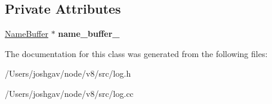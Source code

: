 \subsection*{Private Attributes}
\begin{DoxyCompactItemize}
\item 
\hyperlink{classv8_1_1internal_1_1_code_event_logger_1_1_name_buffer}{Name\+Buffer} $\ast$ {\bfseries name\+\_\+buffer\+\_\+}\hypertarget{classv8_1_1internal_1_1_code_event_logger_aeff32cc91f51a13b85ec4c8d012c31fc}{}\label{classv8_1_1internal_1_1_code_event_logger_aeff32cc91f51a13b85ec4c8d012c31fc}

\end{DoxyCompactItemize}


The documentation for this class was generated from the following files\+:\begin{DoxyCompactItemize}
\item 
/\+Users/joshgav/node/v8/src/log.\+h\item 
/\+Users/joshgav/node/v8/src/log.\+cc\end{DoxyCompactItemize}
